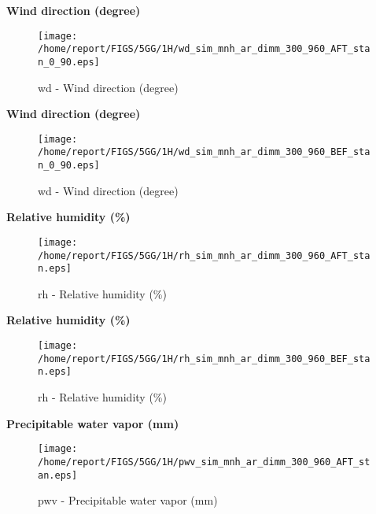 \documentclass[11pt,english]{article}
\begin{document}
\begin{center}
\textbf{Wind direction (degree)}
\end{center}

\begin{figure}[htbp]
\centering
{\texttt{[image: /home/report/FIGS/5GG/1H/wd\_sim\_mnh\_ar\_dimm\_300\_960\_AFT\_stan\_0\_90.eps]}}
\caption{wd - Wind direction (degree)}\label{fig:wd1}
\end{figure}
\newpage

\begin{center}
\textbf{Wind direction (degree)}
\end{center}

\begin{figure}[htbp]
\centering
{\texttt{[image: /home/report/FIGS/5GG/1H/wd\_sim\_mnh\_ar\_dimm\_300\_960\_BEF\_stan\_0\_90.eps]}}
\caption{wd - Wind direction (degree)}\label{fig:wd2}
\end{figure}
\newpage

\begin{center}
\textbf{Relative humidity (\%)}
\end{center}

\begin{figure}[htbp]
\centering
{\texttt{[image: /home/report/FIGS/5GG/1H/rh\_sim\_mnh\_ar\_dimm\_300\_960\_AFT\_stan.eps]}}
\caption{rh - Relative humidity (\%)}\label{fig:rh1}
\end{figure}
\newpage

\begin{center}
\textbf{Relative humidity (\%)}
\end{center}

\begin{figure}[htbp]
\centering
{\texttt{[image: /home/report/FIGS/5GG/1H/rh\_sim\_mnh\_ar\_dimm\_300\_960\_BEF\_stan.eps]}}
\caption{rh - Relative humidity (\%)}\label{fig:rh2}
\end{figure}
\newpage

\begin{center}
\textbf{Precipitable water vapor (mm)}
\end{center}

\begin{figure}[htbp]
\centering
{\texttt{[image: /home/report/FIGS/5GG/1H/pwv\_sim\_mnh\_ar\_dimm\_300\_960\_AFT\_stan.eps]}}
\caption{pwv - Precipitable water vapor (mm)}\label{fig:pwv1}
\end{figure}
\newpage
\end{document}
